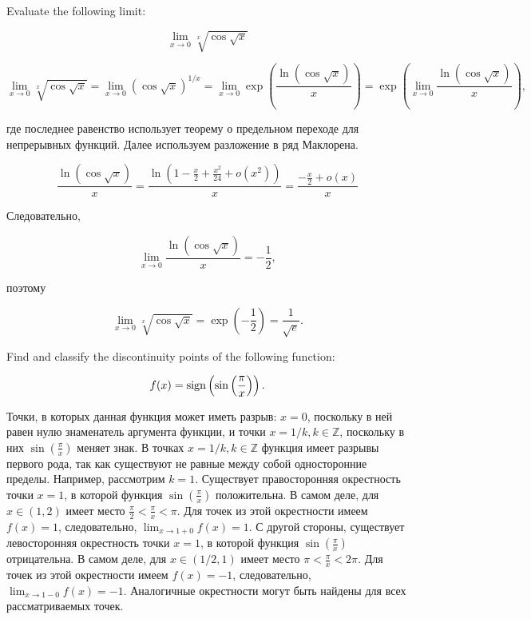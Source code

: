 \documentclass[addpoints, answers]{exam} %
\begin{document}
\begin{questions}

\question[10] Evaluate the following limit:

\[
\lim_{x \to 0} \sqrt[x]{\cos \sqrt{x}}
\]

\begin{solution}

\[
\lim_{x \rightarrow 0} \sqrt[x]{\cos \sqrt{x}} = \lim_{x \rightarrow 0} \left({\cos \sqrt{x}}\right) ^{1/x} =  \lim_{x \rightarrow 0} \exp
\left( \frac{\ln (\cos \sqrt{x})}{x} \right) = \exp \left( \lim_{x \rightarrow 0}
\frac{\ln (\cos \sqrt{x})}{x} \right),
\]

\noindent где последнее равенство использует теорему о предельном переходе для непрерывных функций. Далее используем разложение в ряд Маклорена.

\[
\frac{\ln (\cos \sqrt{x})}{x} = \frac{\ln (1-
\frac{x}{2}+\frac{x^2}{24}+o(x^2))}{x} = \frac{-\frac{x}{2}+o(x)}{x}
\]

\noindent Следовательно,

\[
\lim_{x \rightarrow 0} \frac{\ln (\cos \sqrt{x})}{x} = -\frac{1}{2},
\]

\noindent поэтому

\[
\lim_{x \rightarrow 0} \sqrt[x]{\cos \sqrt{x}} = \exp \left( -\frac{1}{2}\right) = \frac{1}{\sqrt{e}}.
\]
\end{solution}

\question[10] Find and classify the discontinuity points of the following function:

\[
f(x) = {\operatorname{sign}} \left(\sin \left( \frac{\pi}{x}\right)\right).
\]

\begin{solution}
Точки, в которых данная функция может иметь разрыв: $x=0$, поскольку в ней равен нулю знаменатель аргумента функции, и точки $x=1/k, k \in \mathbb{Z}$, поскольку в них $\sin \left( \frac{\pi}{x}\right)$ меняет знак. В точках $x=1/k, k \in \mathbb{Z}$ функция имеет разрывы первого рода, так как существуют не равные между собой односторонние пределы. Например, рассмотрим $k=1$. Существует правосторонняя окрестность точки $x=1$, в которой функция $\sin \left( \frac{\pi}{x} \right)$ положительна. В самом деле, для $x \in (1,2)$ имеет место $\frac{\pi}{2} < \frac{\pi}{x} < \pi$. Для точек из этой окрестности имеем $f(x) = 1$, следовательно, $\lim_{x \rightarrow 1+0} f(x) = 1$. С другой стороны, существует левосторонняя окрестность точки $x=1$, в которой функция $\sin \left( \frac{\pi}{x} \right)$ отрицательна. В самом деле, для $x \in (1/2,1)$ имеет место $\pi < \frac{\pi}{x} < 2 \pi$. Для точек из этой окрестности имеем $f(x) = -1$, следовательно, $\lim_{x \rightarrow 1-0} f(x) = -1$. Аналогичные окрестности могут быть найдены для всех рассматриваемых точек.




\end{solution}
\end{questions}
\end{document}

